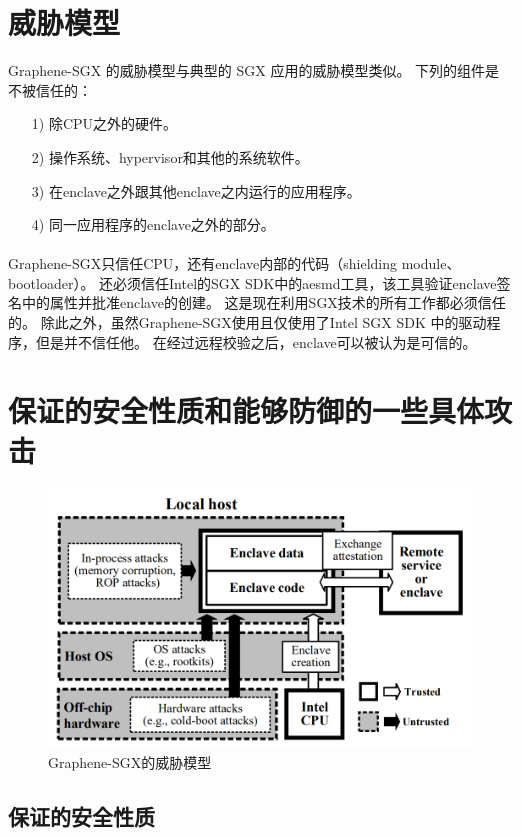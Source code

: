 \section{威胁模型}
Graphene-SGX 的威胁模型与典型的 SGX 应用的威胁模型类似。
下列的组件是不被信任的：
\begin{itemize}
    \item [1)] 
    除CPU之外的硬件。
    \item [2)]
    操作系统、hypervisor和其他的系统软件。
    \item [3)]
    在enclave之外跟其他enclave之内运行的应用程序。
    \item [4)]
    同一应用程序的enclave之外的部分。
\end{itemize}   
\paragraph{}
Graphene-SGX只信任CPU，还有enclave内部的代码（shielding module、bootloader）。
还必须信任Intel的SGX SDK中的aesmd工具，该工具验证enclave签名中的属性并批准enclave的创建。
这是现在利用SGX技术的所有工作都必须信任的。
除此之外，虽然Graphene-SGX使用且仅使用了Intel SGX SDK 中的驱动程序，但是并不信任他。
在经过远程校验之后，enclave可以被认为是可信的\cite{attestation}。
\section{保证的安全性质和能够防御的一些具体攻击}
\begin{figure}
    \centering
    \includegraphics[scale=0.35]{Figures/SGX/threatmodel.png}
    \decoRule
    \caption{Graphene-SGX的威胁模型}
    \label{fig:Graphene}
\end{figure}

\subsection{保证的安全性质}
